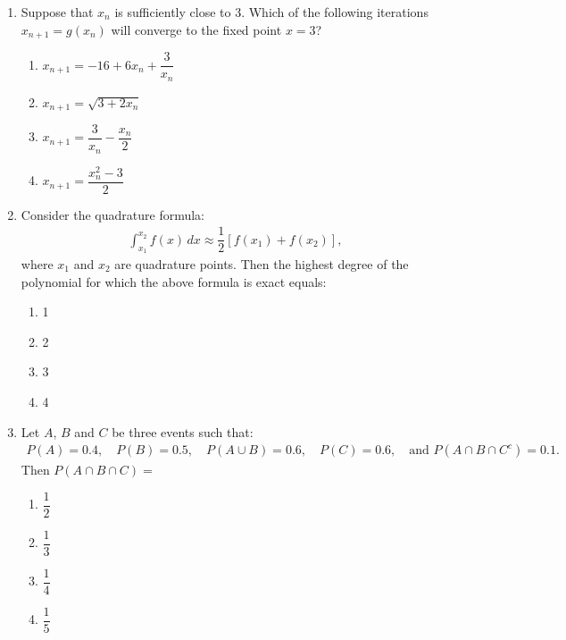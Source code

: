 \documentclass[journal]{IEEEtran}
\numberwithin{equation}{enumi}
\numberwithin{figure}{enumi}
\begin{document}
\begin{enumerate}
\item Suppose that $x_n$ is sufficiently close to 3. Which of the following iterations $x_{n+1} = g(x_n)$ will converge to the fixed point $x = 3$?
\hfill{}
\begin{multicols}{2}
    \begin{enumerate}
        \item $x_{n+1} = -16 + 6x_n + \dfrac{3}{x_n}$
        \item $x_{n+1} = \sqrt{3 + 2x_n}$
        \item $x_{n+1} = \dfrac{3}{x_n} - \dfrac{x_n}{2}$
        \item $x_{n+1} = \dfrac{x_n^2 - 3}{2}$
    \end{enumerate}
    \end{multicols}


\item Consider the quadrature formula:
    \begin{align*}
    \int_{x_1}^{x_2} f(x)\, dx \approx \dfrac{1}{2} \left[f(x_1) + f(x_2)\right],
    \end{align*}
    where $x_1$ and $x_2$ are quadrature points. Then the highest degree of the polynomial for which the above formula is exact equals: 
    \hfill{}
   \begin{multicols}{4}
\begin{enumerate}
    \item 1
    \item 2
    \item 3
    \item 4
\end{enumerate}
\end{multicols}
     

\item Let $A$, $B$ and $C$ be three events such that:
    \begin{align*}
    P(A) = 0.4,\quad P(B) = 0.5,\quad P(A \cup B) = 0.6,\quad P(C) = 0.6,\quad \text{and } P(A \cap B \cap C^c) = 0.1.
    \end{align*}
    Then $P(A \cap B \cap C) =$
    \hfill{}
\begin{multicols}{4}
\begin{enumerate}
    \item $\dfrac{1}{2}$
    \item  $\dfrac{1}{3}$
    \item $\dfrac{1}{4}$
    \item $\dfrac{1}{5}$  
\end{enumerate}
\end{multicols}
        


\end{enumerate}
\end{document}
